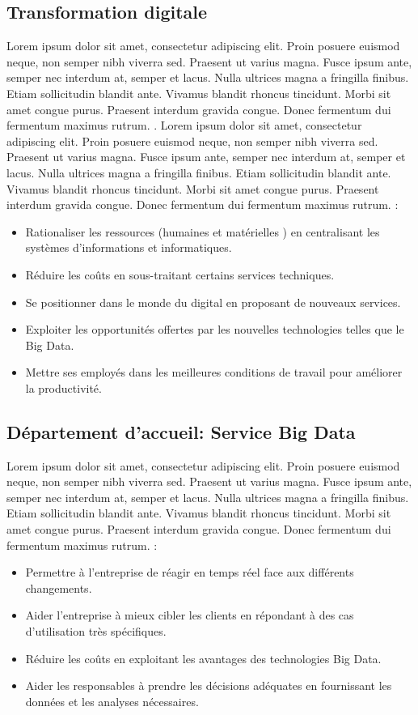 \subsection{Transformation digitale}
Lorem ipsum dolor sit amet, consectetur adipiscing elit. Proin posuere euismod neque, non semper nibh viverra sed. Praesent ut varius magna. Fusce ipsum ante, semper nec interdum at, semper et lacus. Nulla ultrices magna a fringilla finibus. Etiam sollicitudin blandit ante. Vivamus blandit rhoncus tincidunt. Morbi sit amet congue purus. Praesent interdum gravida congue. Donec fermentum dui fermentum maximus rutrum. \parencite{dabi-schwebel_transformation_2019}. Lorem ipsum dolor sit amet, consectetur adipiscing elit. Proin posuere euismod neque, non semper nibh viverra sed. Praesent ut varius magna. Fusce ipsum ante, semper nec interdum at, semper et lacus. Nulla ultrices magna a fringilla finibus. Etiam sollicitudin blandit ante. Vivamus blandit rhoncus tincidunt. Morbi sit amet congue purus. Praesent interdum gravida congue. Donec fermentum dui fermentum maximus rutrum. :
\begin{itemize}
    \item Rationaliser les ressources (humaines et matérielles ) en centralisant les systèmes d'informations et informatiques.
    \item Réduire les coûts en sous-traitant certains services techniques.
    \item Se positionner dans le monde du digital en proposant de nouveaux services.
    \item Exploiter les opportunités offertes par les nouvelles technologies telles que le Big Data.
    \item Mettre ses employés dans les meilleures conditions de travail pour améliorer la productivité.
\end{itemize}

\medskip


\subsection{Département d'accueil: Service Big Data}
Lorem ipsum dolor sit amet, consectetur adipiscing elit. Proin posuere euismod neque, non semper nibh viverra sed. Praesent ut varius magna. Fusce ipsum ante, semper nec interdum at, semper et lacus. Nulla ultrices magna a fringilla finibus. Etiam sollicitudin blandit ante. Vivamus blandit rhoncus tincidunt. Morbi sit amet congue purus. Praesent interdum gravida congue. Donec fermentum dui fermentum maximus rutrum. :
\begin{itemize}
    \item Permettre à l'entreprise de réagir en temps réel face aux différents changements.
    \item Aider l'entreprise à mieux cibler les clients en répondant à des cas d'utilisation très spécifiques.
    \item Réduire les coûts en exploitant les avantages des technologies Big Data.
    \item Aider les responsables à prendre les décisions adéquates en fournissant les données et les analyses nécessaires.
\end{itemize}

